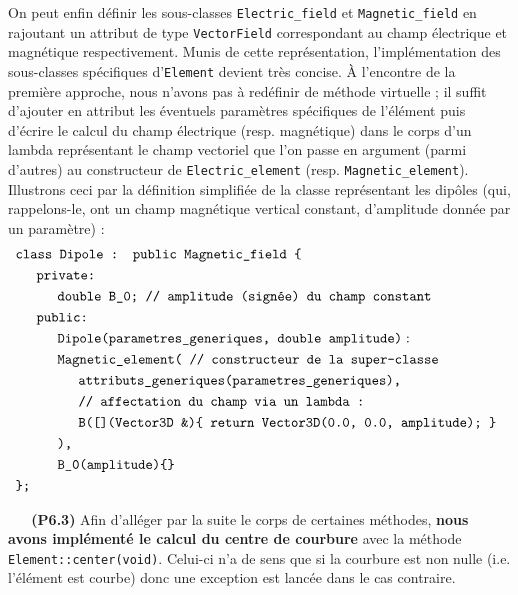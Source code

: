 \documentclass[12pt, letterpaper, twoside]{article}
\newcommand{\T}[1]{\texttt{#1}}
\begin{document}
\indent On peut enfin définir les sous-classes \T{Electric\_field} et \T{Magnetic\_field} en rajoutant un attribut de type \T{VectorField} correspondant au champ électrique et magnétique respectivement. Munis de cette représentation, l'implémentation des sous-classes spécifiques d'\T{Element} devient très concise. À l'encontre de la première approche, nous n'avons pas à redéfinir de méthode virtuelle ; il suffit d'ajouter en attribut les éventuels paramètres spécifiques de l'élément puis d'écrire le calcul du champ électrique (resp. magnétique) dans le corps d'un lambda représentant le champ vectoriel que l'on passe en argument (parmi d'autres) au constructeur de \T{Electric\_element} (resp. \T{Magnetic\_element}).\\ \indent Illustrons ceci par la définition simplifiée de la classe représentant les dipôles (qui, rappelons-le, ont un champ magnétique vertical constant, d'amplitude donnée par un paramètre) :
\begin{align*}
	&\T{class Dipole : public Magnetic\_field \{}\\
	&\indent \T{private:}\\
	& \indent \indent \T{double B\_0; // amplitude (signée) du champ constant}\\
	&\indent \T{public:}\\
	& \indent \indent \T{Dipole(parametres\_generiques, double amplitude)} :\\
	& \indent \indent \T{Magnetic\_element( // constructeur de la super-classe}\\
	& \indent \indent \indent \T{attributs\_generiques(parametres\_generiques),}\\
	& \indent \indent \indent \T{// affectation du champ via un lambda :}\\
	& \indent \indent \indent \T{B([](Vector3D \&)\{ return Vector3D(0.0, 0.0, amplitude); \} }\\
	& \indent \indent \T{),}\\
	& \indent \indent \T{B\_0(amplitude)\{\}}\\
	& \T{\};}
\end{align*}

\ \linebreak
\ \linebreak
\textbf{(P6.3)} Afin d'alléger par la suite le corps de certaines méthodes, \textbf{nous avons implémenté le calcul du centre de courbure} avec la méthode \T{Element::center(void)}. Celui-ci n'a de sens que si la courbure est non nulle (i.e. l'élément est courbe) donc une exception est lancée dans le cas contraire.
\end{document}
